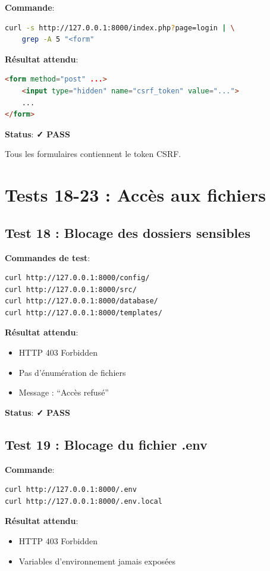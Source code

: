 \documentclass[11pt,a4paper,french]{report}
\newcommand{\pass}{\cellcolor{pass}\textbf{\color{white}✓ PASS}}
\begin{document}
\textbf{Commande}:
\begin{lstlisting}[language=bash]
curl -s http://127.0.0.1:8000/index.php?page=login | \
    grep -A 5 "<form"
\end{lstlisting}

\textbf{Résultat attendu}:
\begin{lstlisting}[language=html]
<form method="post" ...>
    <input type="hidden" name="csrf_token" value="...">
    ...
</form>
\end{lstlisting}

\textbf{Status}: \pass

Tous les formulaires contiennent le token CSRF.

\newpage

\section{Tests 18-23 : Accès aux fichiers}

\subsection{Test 18 : Blocage des dossiers sensibles}

\textbf{Commandes de test}:
\begin{lstlisting}[language=bash]
curl http://127.0.0.1:8000/config/
curl http://127.0.0.1:8000/src/
curl http://127.0.0.1:8000/database/
curl http://127.0.0.1:8000/templates/
\end{lstlisting}

\textbf{Résultat attendu}:
\begin{itemize}
    \item HTTP 403 Forbidden
    \item Pas d'énumération de fichiers
    \item Message : ``Accès refusé''
\end{itemize}

\textbf{Status}: \pass

\subsection{Test 19 : Blocage du fichier .env}

\textbf{Commande}:
\begin{lstlisting}[language=bash]
curl http://127.0.0.1:8000/.env
curl http://127.0.0.1:8000/.env.local
\end{lstlisting}

\textbf{Résultat attendu}:
\begin{itemize}
    \item HTTP 403 Forbidden
    \item Variables d'environnement jamais exposées
\end{itemize}
\end{document}
